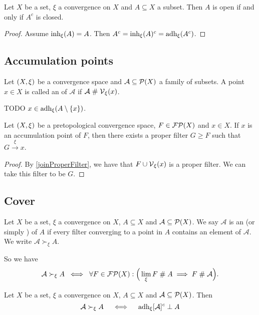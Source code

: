 \begin{lemma}
Let $X$ be a set, $\xi$ a convergence on $X$ and $A\subseteq X$ a subset. Then $A$ is open \textup{if and only if} $A^c$ is closed.
\end{lemma}
\begin{proof}
Assume $\operatorname{inh}_\xi(A) = A$. Then $A^c = \operatorname{inh}_\xi(A)^c = \operatorname{adh}_\xi(A^c)$.
\end{proof}

\subsection{Accumulation points}
\begin{definition}
Let $\left( X,\xi \right)$ be a convergence space and $\mathcal{A}\subseteq \operatorname{\mathcal{P}}(X)$ a family of subsets. A point $x\in X$ is called an  of $\mathcal{A}$ if $\mathcal{A}\mathrel{\#} \operatorname{\mathcal{V}}_\xi(x)$.
\end{definition}

TODO $x\in \operatorname{adh}_\xi(A\setminus\{x\})$.

\begin{proposition} \label{subfilterToAccumulationPoint}
Let $\left( X,\xi \right)$ be a pretopological convergence space, $F\in\operatorname{\mathcal{FP}}(X)$ and $x\in X$. If $x$ is an accumulation point of $F$, then there exists a proper filter $G \geq F$ such that $G\overset{\xi}{\longrightarrow} x$. 
\end{proposition}
\begin{proof}
By \ref{joinProperFilter}, we have that $F\cup \operatorname{\mathcal{V}}_\xi(x)$ is a proper filter. We can take this filter to be $G$.
\end{proof}

\subsection{Cover}
\begin{definition}
Let $X$ be a set, $\xi$ a convergence on $X$, $A\subseteq X$ and $\mathcal{A}\subseteq \operatorname{\mathcal{P}}(X)$.
We say $\mathcal{A}$ is an  (or simply ) of $A$ if every filter converging to a point in $A$ contains an element of $\mathcal{A}$. We write $\mathcal{A} \succ_\xi A$.
\end{definition}
So we have
\[ \mathcal{A} \succ_\xi A \;\iff\; \forall F\in \operatorname{\mathcal{FP}}(X): \Big( \lim_\xi F \mathrel{\#} A \implies F \mathrel{\#} \mathcal{A} \Big). \]

\begin{proposition}
Let $X$ be a set, $\xi$ a convergence on $X$, $A\subseteq X$ and $\mathcal{A}\subseteq \operatorname{\mathcal{P}}(X)$. Then
\[ \mathcal{A} \succ_\xi A \quad\iff\quad \operatorname{adh}_\xi [\mathcal{A}]^c \perp A \]
\end{proposition}


